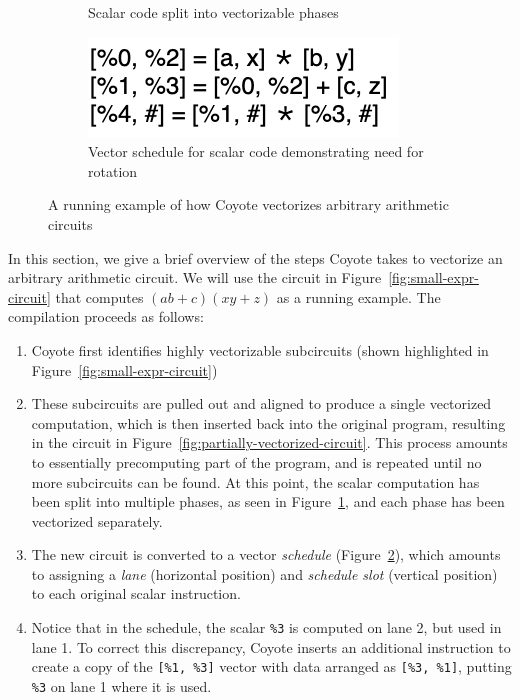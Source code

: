 \begin{figure}
\begin{subfigure}{0.3\columnwidth}
        \caption{Scalar code split into vectorizable phases}
        \label{fig:code-split-phases}
    \end{subfigure}
    \begin{subfigure}{0.6\columnwidth}
        \includegraphics[scale=0.3]{figures/compilation_overview/vector_schedule_needing_rotates.drawio.png}
        \caption{Vector schedule for scalar code demonstrating need for rotation}
        \label{fig:vector-sched-needing-rotates}
    \end{subfigure}
    \caption{A running example of how Coyote vectorizes arbitrary arithmetic circuits}
    \label{fig:toy-running-example}
\end{figure}

In this section, we give a brief overview of the steps Coyote takes to vectorize an arbitrary arithmetic circuit.
We will use the circuit in Figure~\ref{fig:small-expr-circuit} that computes $(ab+c)(xy+z)$ as a running example.
The compilation proceeds as follows:
\begin{enumerate}
    \item Coyote first identifies highly vectorizable subcircuits (shown highlighted in Figure~\ref{fig:small-expr-circuit})
    \item These subcircuits are pulled out and aligned to produce a single vectorized computation, which is then inserted back into the original program, resulting in the circuit in Figure~\ref{fig:partially-vectorized-circuit}. 
    This process amounts to essentially precomputing part of the program, and is repeated until no more subcircuits can be found. 
    At this point, the scalar computation has been split into multiple phases, as seen in Figure~\ref{fig:code-split-phases}, and each phase has been vectorized separately.
    \item The new circuit is converted to a vector {\em schedule} (Figure~\ref{fig:vector-sched-needing-rotates}), which amounts to assigning a {\em lane} (horizontal position) and {\em schedule slot} (vertical position) to each original scalar instruction.
    \item Notice that in the schedule, the scalar \texttt{\%3} is computed on lane 2, but used in lane 1. To correct this discrepancy, Coyote inserts an additional instruction to create a copy of the \texttt{[\%1, \%3]} vector with data arranged as \texttt{[\%3, \%1]}, putting \texttt{\%3} on lane 1 where it is used.
\end{enumerate}

